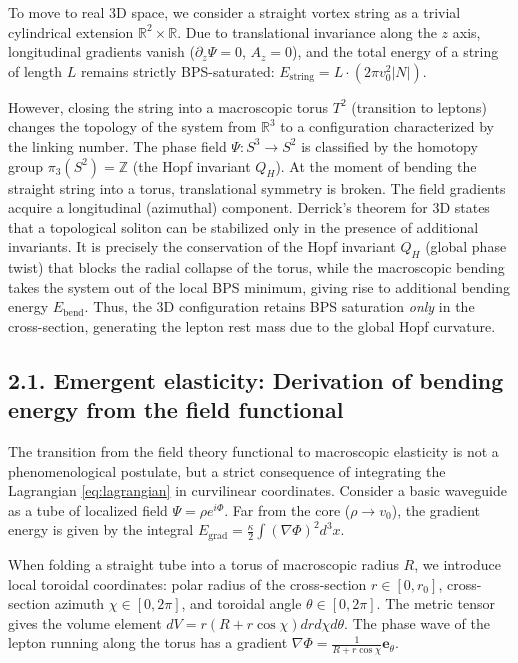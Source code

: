 \documentclass[11pt,a4paper]{article}
\begin{document}
To move to real 3D space, we consider a straight vortex string as a trivial cylindrical extension $\mathbb{R}^2 \times \mathbb{R}$. Due to translational invariance along the $z$ axis, longitudinal gradients vanish ($\partial_z \Psi = 0$, $A_z = 0$), and the total energy of a string of length $L$ remains strictly BPS-saturated: $E_{\text{string}} = L \cdot (2\pi v_0^2 |N|)$. 

However, closing the string into a macroscopic torus $T^2$ (transition to leptons) changes the topology of the system from $\mathbb{R}^3$ to a configuration characterized by the linking number. The phase field $\Psi: S^3 \to S^2$ is classified by the homotopy group $\pi_3(S^2) = \mathbb{Z}$ (the Hopf invariant $Q_H$).
At the moment of bending the straight string into a torus, translational symmetry is broken. The field gradients acquire a longitudinal (azimuthal) component. Derrick's theorem for 3D states that a topological soliton can be stabilized only in the presence of additional invariants. It is precisely the conservation of the Hopf invariant $Q_H$ (global phase twist) that blocks the radial collapse of the torus, while the macroscopic bending takes the system out of the local BPS minimum, giving rise to additional bending energy $E_{\text{bend}}$. Thus, the 3D configuration retains BPS saturation \textit{only} in the cross-section, generating the lepton rest mass due to the global Hopf curvature.

\subsection{2.1. Emergent elasticity: Derivation of bending energy from the field functional}
The transition from the field theory functional to macroscopic elasticity is not a phenomenological postulate, but a strict consequence of integrating the Lagrangian \eqref{eq:lagrangian} in curvilinear coordinates.
Consider a basic waveguide as a tube of localized field $\Psi = \rho e^{i\Phi}$. Far from the core ($\rho \to v_0$), the gradient energy is given by the integral $E_{\text{grad}} = \frac{\kappa}{2} \int (\nabla \Phi)^2 d^3x$.

When folding a straight tube into a torus of macroscopic radius $R$, we introduce local toroidal coordinates: polar radius of the cross-section $r \in [0, r_0]$, cross-section azimuth $\chi \in [0, 2\pi]$, and toroidal angle $\theta \in [0, 2\pi]$. The metric tensor gives the volume element $dV = r(R + r\cos\chi) dr d\chi d\theta$.
The phase wave of the lepton running along the torus has a gradient $\nabla \Phi = \frac{1}{R + r\cos\chi} \mathbf{e}_\theta$.
\end{document}
